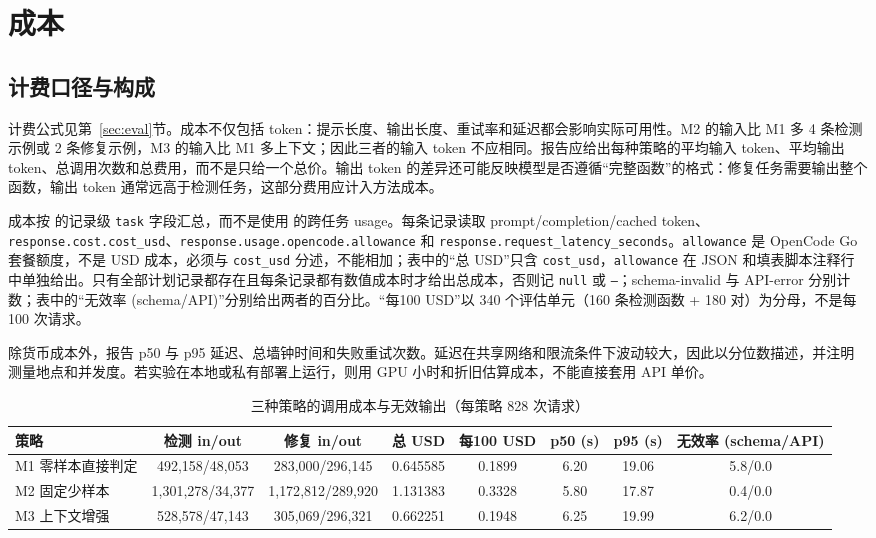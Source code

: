 \documentclass[conference]{IEEEtran}
\begin{document}
\section{成本}
\label{sec:cost}

\subsection{计费口径与构成}
计费公式见第~\ref{sec:eval}节。成本不仅包括 token：提示长度、输出长度、重试率和延迟都会影响实际可用性。M2 的输入比 M1 多 4 条检测示例或 2 条修复示例，M3 的输入比 M1 多上下文；因此三者的输入 token 不应相同。报告应给出每种策略的平均输入 token、平均输出 token、总调用次数和总费用，而不是只给一个总价。输出 token 的差异还可能反映模型是否遵循“完整函数”的格式：修复任务需要输出整个函数，输出 token 通常远高于检测任务，这部分费用应计入方法成本。

成本按  的记录级 \texttt{task} 字段汇总，而不是使用  的跨任务 usage。每条记录读取 prompt/completion/cached token、\texttt{response.cost.cost\_usd}、\texttt{response.usage.opencode.allowance} 和 \texttt{response.request\_latency\_seconds}。\texttt{allowance} 是 OpenCode Go 套餐额度，不是 USD 成本，必须与 \texttt{cost\_usd} 分述，不能相加；表中的“总 USD”只含 \texttt{cost\_usd}，\texttt{allowance} 在 JSON 和填表脚本注释行中单独给出。只有全部计划记录都存在且每条记录都有数值成本时才给出总成本，否则记 \texttt{null} 或 \texttt{---}；schema-invalid 与 API-error 分别计数；表中的“无效率 (schema/API)”分别给出两者的百分比。“每100 USD”以 340 个评估单元（160 条检测函数 + 180 对）为分母，不是每 100 次请求。

除货币成本外，报告 p50 与 p95 延迟、总墙钟时间和失败重试次数。延迟在共享网络和限流条件下波动较大，因此以分位数描述，并注明测量地点和并发度。若实验在本地或私有部署上运行，则用 GPU 小时和折旧估算成本，不能直接套用 API 单价。

\begin{table}[t]
\caption{三种策略的调用成本与无效输出（每策略 828 次请求）}
\label{tab:cost}
\centering
\scriptsize
\begin{tabular}{@{}lccccccc@{}}
\toprule
策略 & 检测 in/out & 修复 in/out & 总 USD & 每100 USD & p50 (s) & p95 (s) & 无效率 (schema/API)\\
\midrule
M1 零样本直接判定 & 492{,}158/48{,}053 & 283{,}000/296{,}145 & 0.645585 & 0.1899 & 6.20 & 19.06 & 5.8/0.0\\
M2 固定少样本 & 1{,}301{,}278/34{,}377 & 1{,}172{,}812/289{,}920 & 1.131383 & 0.3328 & 5.80 & 17.87 & 0.4/0.0\\
M3 上下文增强 & 528{,}578/47{,}143 & 305{,}069/296{,}321 & 0.662251 & 0.1948 & 6.25 & 19.99 & 6.2/0.0\\
\bottomrule
\end{tabular}
\end{table}
\end{document}
